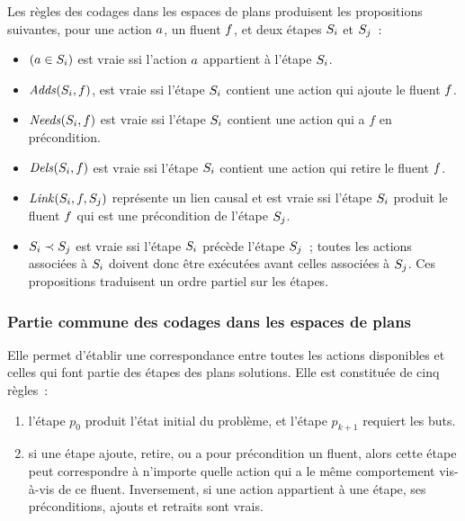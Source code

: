{Les règles des codages dans les espaces de plans produisent les propositions
suivantes, pour une action $a$, un fluent $f$, et deux étapes $S_{i}$ et $S_{j}$~:

\begin{itemize}
\item $(a \in S_{i})$ est vraie ssi l'action $a$ appartient à l'étape $S_{i}$.
\item $\mathit{Adds}(S_{i},f)$, est vraie ssi l'étape $S_{i}$ contient une action qui ajoute le
  fluent $f$.
\item $\mathit{Needs}(S_{i},f)$ est vraie ssi l'étape $S_{i}$ contient une action qui a $f$ en
  précondition.
\item $\mathit{Dels}(S_{i},f)$ est vraie ssi l'étape $S_{i}$ contient une action qui retire le
  fluent $f$.
\item $\mathit{Link}(S_{i},f,S_{j})$ représente un lien causal et est vraie ssi l'étape
  $S_{i}$ produit le fluent $f$ qui est une précondition de l'étape $S_{j}$.
\item $S_{i} \prec S_{j}$ est vraie ssi l'étape $S_{i}$ précède l'étape $S_{j}$~; toutes les actions
  associées à $S_{i}$ doivent donc être exécutées avant celles associées à $S_{j}$.
  Ces propositions traduisent un ordre partiel sur les étapes.
\end{itemize}


\subsubsection{Partie commune des codages dans les espaces de plans}

Elle permet d'établir une correspondance entre toutes les actions disponibles et
celles qui font partie des étapes des plans solutions. Elle est constituée
de cinq règles~:

\begin{enumerate}
\item {} l'étape $p_0$ produit l'état
  initial du problème, et l'étape $p_{k+1}$ requiert les buts.
\item {} si une étape ajoute, retire, ou a
  pour précondition un fluent, alors cette étape peut correspondre à n'importe
  quelle action qui a le même comportement vis-à-vis de ce fluent. Inversement,
  si une action appartient à une étape, ses préconditions, ajouts et retraits
  sont vrais.


\end{enumerate}}
